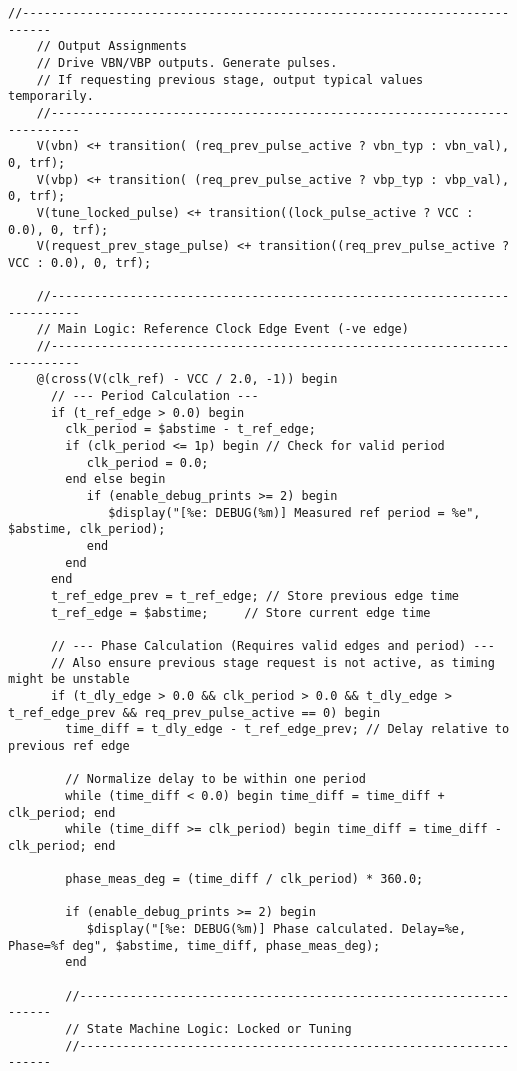 \begin{lstlisting}[caption={Verilog-A Generic Vb Tuner Implementation}]
    //--------------------------------------------------------------------------
    // Output Assignments
    // Drive VBN/VBP outputs. Generate pulses.
    // If requesting previous stage, output typical values temporarily.
    //--------------------------------------------------------------------------
    V(vbn) <+ transition( (req_prev_pulse_active ? vbn_typ : vbn_val), 0, trf);
    V(vbp) <+ transition( (req_prev_pulse_active ? vbp_typ : vbp_val), 0, trf);
    V(tune_locked_pulse) <+ transition((lock_pulse_active ? VCC : 0.0), 0, trf);
    V(request_prev_stage_pulse) <+ transition((req_prev_pulse_active ? VCC : 0.0), 0, trf);

    //--------------------------------------------------------------------------
    // Main Logic: Reference Clock Edge Event (-ve edge)
    //--------------------------------------------------------------------------
    @(cross(V(clk_ref) - VCC / 2.0, -1)) begin
      // --- Period Calculation ---
      if (t_ref_edge > 0.0) begin
        clk_period = $abstime - t_ref_edge;
        if (clk_period <= 1p) begin // Check for valid period
           clk_period = 0.0;
        end else begin
           if (enable_debug_prints >= 2) begin
              $display("[%e: DEBUG(%m)] Measured ref period = %e", $abstime, clk_period);
           end
        end
      end
      t_ref_edge_prev = t_ref_edge; // Store previous edge time
      t_ref_edge = $abstime;     // Store current edge time

      // --- Phase Calculation (Requires valid edges and period) ---
      // Also ensure previous stage request is not active, as timing might be unstable
      if (t_dly_edge > 0.0 && clk_period > 0.0 && t_dly_edge > t_ref_edge_prev && req_prev_pulse_active == 0) begin
        time_diff = t_dly_edge - t_ref_edge_prev; // Delay relative to previous ref edge

        // Normalize delay to be within one period
        while (time_diff < 0.0) begin time_diff = time_diff + clk_period; end
        while (time_diff >= clk_period) begin time_diff = time_diff - clk_period; end

        phase_meas_deg = (time_diff / clk_period) * 360.0;

        if (enable_debug_prints >= 2) begin
           $display("[%e: DEBUG(%m)] Phase calculated. Delay=%e, Phase=%f deg", $abstime, time_diff, phase_meas_deg);
        end

        //------------------------------------------------------------------
        // State Machine Logic: Locked or Tuning
        //------------------------------------------------------------------


\end{lstlisting}
